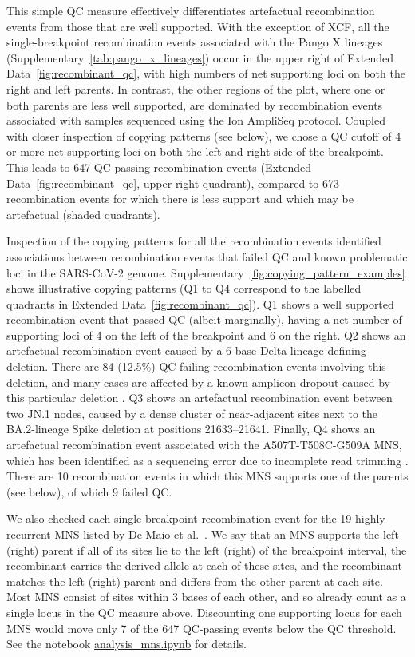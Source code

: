 \documentclass[12pt]{article}
\newcommand{\edref}[1]{Extended Data~\ref{#1}}
\newcommand{\siref}[1]{Supplementary~\ref{#1}}
\begin{document}
This simple QC measure effectively differentiates
artefactual recombination events from those that are well supported.
With the exception of XCF,
all the single-breakpoint recombination events
associated with the Pango X lineages (\siref{tab:pango_x_lineages})
occur in the upper right of \edref{fig:recombinant_qc},
with high numbers of net supporting loci on both the right and left parents.
In contrast, the other regions of the plot,
where one or both parents are less well supported,
are dominated by recombination events associated with
samples sequenced using the Ion AmpliSeq protocol.
Coupled with closer inspection of copying patterns (see below),
we chose a QC cutoff of 4 or more net supporting loci
on both the left and right side of the breakpoint.
This leads to 647 QC-passing recombination events
(\edref{fig:recombinant_qc}, upper right quadrant),
compared to 673 recombination events
for which there is less support and which may be artefactual (shaded quadrants).

Inspection of the copying patterns for all the recombination events
identified associations between recombination events that failed QC and
known problematic loci in the SARS-CoV-2 genome.
\siref{fig:copying_pattern_examples} shows illustrative copying patterns
(Q1 to Q4 correspond to the labelled quadrants in \edref{fig:recombinant_qc}).
Q1 shows a well supported recombination event that passed QC (albeit marginally),
having a net number of supporting loci of 4 on the left of the breakpoint
and 6 on the right.
Q2 shows an artefactual recombination event
caused by a 6-base Delta lineage-defining deletion.
There are 84 (12.5\%) QC-failing recombination events involving this deletion, and
many cases are affected by a known amplicon dropout
caused by this particular deletion \cite{Sanderson2021}.
Q3 shows an artefactual recombination event between two JN.1 nodes,
caused by a dense cluster of near-adjacent sites next to
the BA.2-lineage Spike deletion at positions 21633--21641.
Finally, Q4 shows an artefactual recombination event
associated with the A507T-T508C-G509A MNS,
which has been identified as a sequencing error
due to incomplete read trimming \cite{DeMaio2024}.
There are 10 recombination events in which this MNS supports one of the parents
(see below), of which 9 failed QC.

We also checked each single-breakpoint recombination event for the
19 highly recurrent MNS listed by De Maio et al.~\cite{DeMaio2024}.
We say that an MNS supports the left (right) parent if
all of its sites lie to the left (right) of the breakpoint interval,
the recombinant carries the derived allele at each of these sites,
and the recombinant matches the left (right) parent
and differs from the other parent at each site.
Most MNS consist of sites within 3 bases of each other, and so
already count as a single locus in the QC measure above.
Discounting one supporting locus for each MNS
would move only 7 of the 647 QC-passing events below the QC threshold.
See the notebook
\href{https://github.com/jeromekelleher/sc2ts-paper/blob/main/notebooks/analysis\_mns.ipynb}{analysis\_mns.ipynb}
for details.
\end{document}
